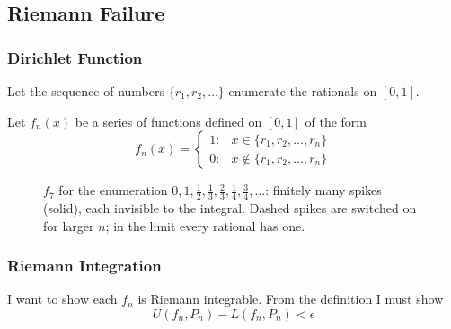 \documentclass[12pt]{article}
\theoremstyle{plain}
\theoremstyle{definition}
\theoremstyle{definition}
\theoremstyle{remark}
\begin{document}
\subsection{Riemann Failure}


\subsubsection{Dirichlet Function}
Let the sequence of numbers $\{r_1, r_2, \ldots\}$ enumerate the rationals on $[0, 1]$.

Let $f_n(x)$ be a series of functions defined on $[0, 1]$ of the form
\begin{equation}
    f_n(x) = \begin{cases}
    1: & x \in \{r_1, r_2, \ldots, r_n\} \\
    0: & x \not\in \{r_1, r_2, \ldots, r_n\}
          \end{cases}
\end{equation}

\begin{figure}[h]
\centering
{}
\caption{$f_7$ for the enumeration $0,1,\tfrac12,\tfrac13,\tfrac23,\tfrac14,\tfrac34,\ldots$:
finitely many spikes (solid), each invisible to the integral. Dashed spikes are switched on
for larger $n$; in the limit every rational has one.}
\end{figure}


\subsubsection{Riemann Integration}
I want to show each $f_n$ is Riemann integrable. From the definition I must show
\begin{equation*}
    U(f_n, P_n) - L(f_n, P_n) < \epsilon
\end{equation*}
\end{document}
